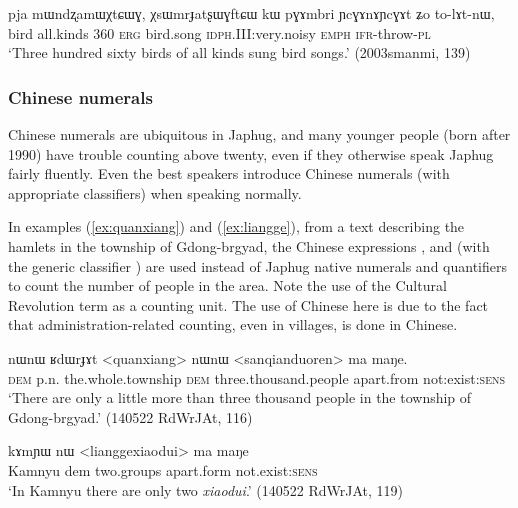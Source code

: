 \begin{exe}
\ex \label{ex:gsum.brgya.drug.bcu}
\gll pja mɯndʐamɯχtɕɯɣ, χsɯmrɟatʂɯɣftɕɯ kɯ pɣɤmbri ɲcɣɤnɤɲcɣɤt ʑo to-lɤt-nɯ, \\
 bird all.kinds 360 \textsc{erg} bird.song \textsc{idph}.III:very.noisy \textsc{emph} \textsc{ifr}-throw-\textsc{pl} \\
\glt `Three hundred sixty birds of all kinds sung bird songs.' (2003smanmi, 139)
\end{exe}

\subsubsection{Chinese numerals}  \label{sec:chinese.numerals}
Chinese numerals are ubiquitous in Japhug, and many younger people (born after 1990) have trouble counting above twenty, even if they otherwise speak Japhug fairly fluently. Even the best speakers introduce Chinese numerals (with appropriate classifiers) when speaking normally. 

In examples (\ref{ex:quanxiang}) and (\ref{ex:liangge}), from a text describing the hamlets in the township of Gdong-brgyad, the Chinese expressions ,  and  (with the generic classifier ) are used instead of Japhug native numerals and quantifiers to count the number of people in the area. Note the use of the Cultural Revolution term  as a counting unit. The use of Chinese here is due to the fact that administration-related counting, even in villages, is done in Chinese.

\begin{exe}
\ex \label{ex:quanxiang}
\gll nɯnɯ ʁdɯrɟɤt <quanxiang> nɯnɯ <sanqianduoren> ma maŋe. \\
 \textsc{dem} p.n. the.whole.township \textsc{dem} three.thousand.people apart.from not:exist:\textsc{sens} \\
\glt  `There are only a little more than three thousand people in the township of Gdong-brgyad.' (140522 RdWrJAt, 116)
\end{exe}
 
\begin{exe}
\ex \label{ex:liangge}
\gll  kɤmɲɯ nɯ <lianggexiaodui> ma maŋe \\
 Kamnyu dem two.groups apart.form not.exist:\textsc{sens} \\
\glt `In Kamnyu there are only two \textit{xiaodui}.' (140522 RdWrJAt, 119)
\end{exe} 

